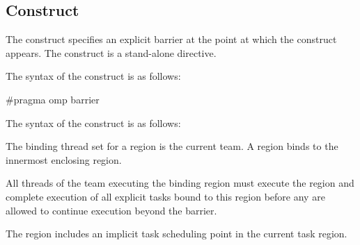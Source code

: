 \subsection{ Construct}
\label{subsec:barrier Construct}
\summary
The  construct specifies an explicit barrier at the point at which the construct
appears. The  construct is a stand-alone directive.

\syntax
\begin{ccppspecific}
The syntax of the  construct is as follows:

\begin{ompcPragma}
#pragma omp barrier 
\end{ompcPragma}
\end{ccppspecific}

\begin{fortranspecific}
The syntax of the  construct is as follows:

\end{fortranspecific}

\binding
The binding thread set for a  region is the current team. A  region
binds to the innermost enclosing  region.

\descr
All threads of the team executing the binding  region must execute the
 region and complete execution of all explicit tasks bound to this 
region before any are allowed to continue execution beyond the barrier.

The  region includes an implicit task scheduling point in the current task
region.

